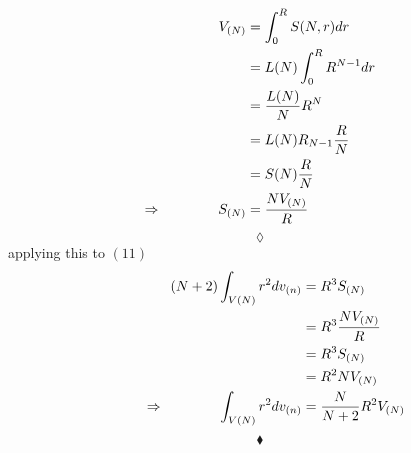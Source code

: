 \begin{align}
V_{(N)} &= \int_{0}^{R} S(N,r) dr\\
&= L(N)\int_{0}^{R} R^{N-1} dr\\
&= \frac{L(N)}{N} R^{N}\\
&= L(N)R_{N-1}\frac{R}{N} \\
&= S(N)\frac{R}{N}\\
\Rightarrow\quad\quad\quad\quad S_{(N)} &=\frac{N V_{(N)}}{R}
\end{align}
$$\lozenge$$
applying this to $(11)$ 
\begin{align}
\quad\quad\quad\quad \left(N+2\right)\int_{V(N)} r^2 dv_{(n)} &=R^3 S_{(N)}\\
&=R^3 \frac{N V_{(N)}}{R}\\ 
&=R^3 S_{(N)}\\
&=R^2 N V_{(N)}\\
\Rightarrow \quad\quad\quad\quad  \int_{V(N)} r^2 dv_{(n)} &= \frac{N}{N+2} R^2 V_{(N)}
\end{align}
$$\blacklozenge$$


